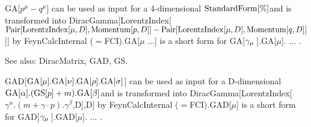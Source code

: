 




GA[\({p^{\mu }}-{q^{\mu }}\)] can be used as input for a 4-dimensional \(\mathrm{StandardForm}[\%]\)and is transformed into DiracGamma[LorentzIndex[\(\mathrm{Pair}[\mathrm{LorentzIndex}[\mu
,D],\mathrm{Momentum}[p,D]]-
   \mathrm{Pair}[\mathrm{LorentzIndex}[\mu ,D],\mathrm{Momentum}[q,D]]\)]] by FeynCalcInternal (\(=\)FCI).GA[\(\mu \) ...] is
a short form for GA[\({{\gamma }_{\mu }}\> \)].GA[\(\mu \)]. ... .

See also:  DiracMatrix, GAD, GS.


\dispSFinmath{
\mu ,\nu ,
}

\dispSFoutmath{
\mu 
}

\dispSFinmath{
\nu 
}


\dispSFinmath{
{{\gamma }^{\mu }}
}










GAD[\(\mathrm{GA}[\mu ].\mathrm{GA}[\nu ].\mathrm{GA}[\rho ].\mathrm{GA}[\sigma ]\)] can be used as input for a D-dimensional
\(\mathrm{GA}[\alpha ].(\mathrm{GS}[p]+m).\mathrm{GA}[\beta ]\)and is transformed into DiracGamma[LorentzIndex[\({{\gamma }^{\alpha
}}.(m+\gamma \cdot p).{{\gamma }^{\beta }}\),D],D] by FeynCalcInternal (\(=\)FCI).GAD[\(\mu \)] is a short form for GAD[\({{\gamma }_{\mu }}\>
\)].GAD[\(\mu \)]. ... .


